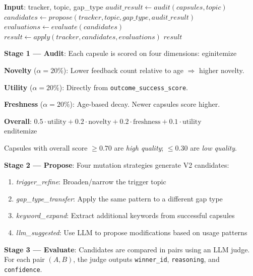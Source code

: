 \documentclass[anon,9pt]{article}
\begin{document}
\begin{algorithm}[H]
\caption{InsightEvolution.run\_full\_cycle()}
\begin{algorithmic}[1]
\State \textbf{Input}: tracker, topic, gap\_type
\State $audit\_result \gets audit(capsules, topic)$ 
\State $candidates \gets propose(tracker, topic, gap\_type, audit\_result)$ 
\State $evaluations \gets evaluate(candidates)$ 
\State $result \gets apply(tracker, candidates, evaluations)$ 
\State \Return $result$
\end{algorithmic}
\end{algorithm}

\textbf{Stage 1 --- Audit}: Each capsule is scored on four dimensions:
\egin{itemize}
    \item \textbf{Novelty} ($\alpha=20\%$): Lower feedback count relative to age $\Rightarrow$ higher novelty.
    \item \textbf{Utility} ($\alpha=20\%$): Directly from \texttt{outcome\_success\_score}.
    \item \textbf{Freshness} ($\alpha=20\%$): Age-based decay. Newer capsules score higher.
    \item \textbf{Overall}: $0.5 \cdot \text{utility} + 0.2 \cdot \text{novelty} + 0.2 \cdot \text{freshness} + 0.1 \cdot \text{utility}$
\\end{itemize}

Capsules with overall score $\geq 0.70$ are \textit{high quality}; $\leq 0.30$ are \textit{low quality}.

\textbf{Stage 2 --- Propose}: Four mutation strategies generate V2 candidates:
\begin{enumerate}
    \item \textit{trigger\_refine}: Broaden/narrow the trigger topic
    \item \textit{gap\_type\_transfer}: Apply the same pattern to a different gap type
    \item \textit{keyword\_expand}: Extract additional keywords from successful capsules
    \item \textit{llm\_suggested}: Use LLM to propose modifications based on usage patterns
\end{enumerate}

\textbf{Stage 3 --- Evaluate}: Candidates are compared in pairs using an LLM judge. For each pair $(A, B)$, the judge outputs \texttt{winner\_id}, \texttt{reasoning}, and \texttt{confidence}.
\end{document}
